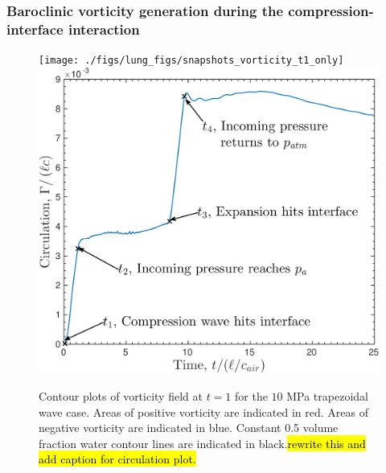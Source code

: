\subsubsection{Baroclinic vorticity generation during the compression-interface interaction}
\begin{figure}[h] 
  \centering
  \texttt{[image: ./figs/lung\_figs/snapshots\_vorticity\_t1\_only]}
  \includegraphics[height=0.3\textheight]{./figs/lung_figs/trapz10_circ_schematic}
  \caption[\hl{PUT SOMETHING HERE}] {Contour plots of vorticity
    field at $t=1$ for the $10$ MPa trapezoidal wave case. Areas
    of positive vorticity are indicated in red. Areas of negative
    vorticity are indicated in blue. Constant 0.5 volume fraction
    water contour lines are indicated in black.\hl{rewrite this and add caption for circulation plot.}}
  \label{fig:circulation_schematic}
\end{figure}


